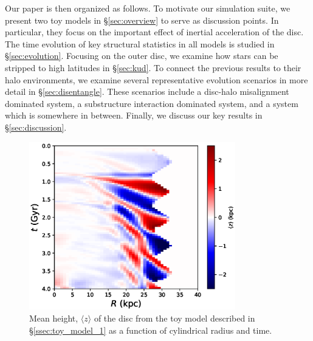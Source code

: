 Our paper is then organized as follows. To motivate our simulation suite, we present two toy models in \S\ref{sec:overview} to serve as discussion points. In particular, they focus on the important effect of inertial acceleration of the disc.  The time evolution of key structural statistics in all models is studied in \S \ref{sec:evolution}. Focusing on the outer disc, we examine how stars can be stripped to high latitudes in \S \ref{sec:kud}. To connect the previous results to their halo environments, we examine several representative evolution scenarios in more detail in \S\ref{sec:disentangle}. These scenarios include a disc-halo misalignment dominated system, a substructure interaction dominated system, and a system which is somewhere in between. Finally, we discuss our key results in \S\ref{sec:discussion}.



\begin{figure}
	\centering
	\includegraphics[width=0.8\textwidth]{../figures/isolated_z_0_r_a.eps}
	\caption{Mean height, $\langle z \rangle$ of the disc from the toy model described in \S\ref{ssec:toy_model_1} as a function of cylindrical radius and time.} \label{fig:toy_model_1_mean_height}
\end{figure}

